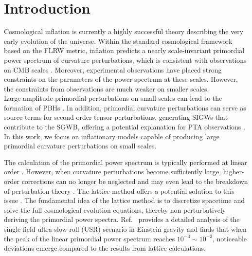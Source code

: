 \documentclass[reprint, 10pt, amsmath, amssymb, floatfix, aps, prd, superscriptaddress, nofootinbib, nobibnotes,twocolumn]{revtex4-1}
\begin{document}
\section{Introduction}
\label{sec:intro}
Cosmological inflation is currently a highly successful theory describing the very early evolution of the universe. Within the standard cosmological framework based on the \ac{FLRW} metric, inflation predicts a nearly scale-invariant primordial power spectrum of curvature perturbations, which is consistent with observations on \ac{CMB} scales \cite{Planck:2018vyg}. Moreover, experimental observations have placed strong constraints on the parameters of the power spectrum at these scales. However, the constraints from observations are much weaker on smaller scales. Large‑amplitude primordial perturbations on small scales can lead to the formation of \acp{PBH} \cite{Kawai:2021edk,Carr:2020xqk,Saito:2008jc,Garcia-Bellido:2017aan,Bartolo:2018evs,Ferrante:2022mui,LISACosmologyWorkingGroup:2023njw,Iovino:2024tyg,DeLuca:2020agl,Choudhury:2023rks,Fang:2025vhi,Pi:2026uxd,Allegrini:2026jqt,Wang:2026sgz,Bi:2026zlt}. In addition, primordial curvature perturbations can serve as source terms for second‑order tensor perturbations, generating \acp{SIGW} that contribute to the \ac{SGWB}, offering a potential explanation for \ac{PTA} observations \cite{Domenech:2021ztg,Chang:2023aba,Cai:2018dig,Baumann:2007zm,Ananda:2006af,NANOGrav:2023hvm,Franciolini:2023pbf,Vaskonen:2020lbd,Wang:2023ost,Domenech:2025ccu,LISACosmologyWorkingGroup:2025vdz,LISACosmologyWorkingGroup:2024hsc,Chen:2026scy,Bhaumik:2026rzf,Caporali:2026qhc,Zhang:2026hqg,Zhao:2026jax,Domenech:2026nun}. In this work, we focus on inflationary models capable of producing large primordial curvature perturbations on small scales.



The calculation of the primordial power spectrum is typically performed at linear order \cite{Karam:2022nym,Zhou:2020kkf,Ragavendra:2020sop,Ballesteros:2020qam,Cai:2019bmk,Ozsoy:2019lyy,Chen:2019zza,Carrilho:2019oqg,Pi:2021dft,Guzzetti:2016mkm,Malik:2008im,Di:2017ndc,Kim:2025dyi,Huang:2026bwa,Rashidi:2026wtj,Dalianis:2026tty}. However, when curvature perturbations become sufficiently large, higher-order corrections can no longer be neglected and may even lead to the breakdown of perturbation theory \cite{Davies:2023hhn,Firouzjahi:2023bkt,Braglia:2025cee,Fumagalli:2023loc,Cheng:2023ikq,Firouzjahi:2023btw,Firouzjahi:2023aum,Firouzjahi:2024sce,Fumagalli:2024jzz,Kawaguchi:2024rsv,Choudhury:2024dzw,Choudhury:2024dei}. The lattice method offers a potential solution to this issue \cite{Saha:2026cay,Launay:2025lnc,Jamieson:2025ngu}. The fundamental idea of the lattice method is to discretize spacetime and solve the full cosmological evolution equations, thereby non-perturbatively deriving the primordial power spectra. Ref.~\cite{Caravano:2024moy} provides a detailed analysis of the single-field ultra-slow-roll (USR) scenario in Einstein gravity and finds that when the peak of the linear primordial power spectrum reaches $10^{-3} \sim 10^{-2}$, noticeable deviations emerge compared to the results from lattice calculations.
\end{document}
